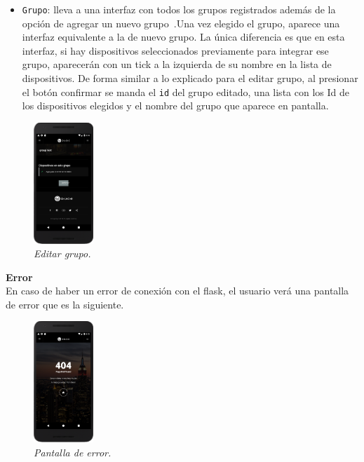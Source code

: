 \begin{itemize}
  \item \lstinline[columns=fixed]{Grupo}: lleva a una interfaz con todos los grupos registrados además de la opción de agregar un nuevo grupo~.Una vez elegido el grupo, aparece una interfaz equivalente a la de nuevo grupo. La única diferencia es que en esta interfaz, si hay dispositivos seleccionados previamente para integrar ese grupo, aparecerán con un tick a la izquierda de su nombre en la lista de dispositivos. De forma similar a lo explicado para el editar grupo, al presionar el botón confirmar se manda el \lstinline[columns=fixed]{id} del grupo editado, una lista con los Id de los dispositivos elegidos y el nombre del grupo que aparece en pantalla.
\end{itemize}

\begin{figure}[H]
  \centering
  \includegraphics[width=0.2\textwidth, keepaspectratio]{images/app-movil-edit-group}
  \caption{\textit{Editar grupo.}}
  \label{fig:app-movil-edit-group}
\end{figure}

\textbf{Error}\\
En caso de haber un error de conexión con el flask, el usuario verá una pantalla de error que es la siguiente.

\begin{figure}[H]
  \centering
  \includegraphics[width=0.2\textwidth, keepaspectratio]{images/app-movil-error}
  \caption{\textit{Pantalla de error.}}
  \label{fig:app-movil-error}
\end{figure}

